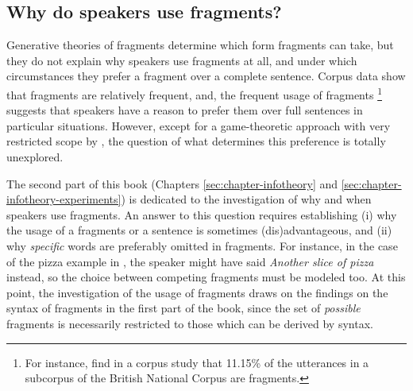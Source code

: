 \subsection{Why do speakers use fragments?}
Generative theories of fragments determine which form fragments can take, but they do not explain why speakers use fragments at all, and under which circumstances they prefer a fragment over a complete sentence. Corpus data show that fragments are relatively frequent, and, the frequent usage of fragments%
%
\footnote{For instance, \citet{fernandez.ginzburg2002} find in a corpus study that 11.15\% of the utterances in a subcorpus of the British National Corpus \citep{burnard2000} are fragments.}\afterfn%
%
suggests that speakers have a reason to prefer them over full sentences in particular situations. However, except for a game-theoretic approach with very restricted scope by \citet{bergen.goodman2015}, the question of what determines this preference is totally unexplored.

The second part of this book (Chapters \ref{sec:chapter-infotheory} and \ref{sec:chapter-infotheory-experiments}) is dedicated to the investigation of why and when speakers use fragments. An answer to this question requires establishing (i) why the usage of a fragments or a sentence is sometimes (dis)advantageous, and (ii) why \textit{specific} words are preferably omitted in fragments. For instance, in the case of the pizza example in \Last, the speaker might have said \textit{Another slice of pizza} instead, so the choice between competing fragments must be modeled too. At this point, the investigation of the usage of fragments draws on the findings on the syntax of fragments in the first part of the book, since the set of \textit{possible} fragments is necessarily restricted to those which can be derived by syntax. 

